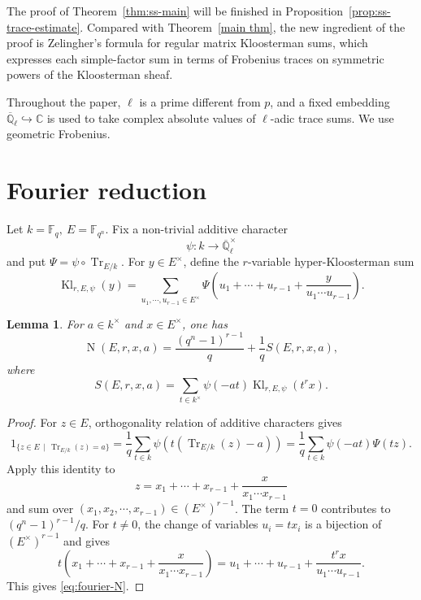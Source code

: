 \documentclass[11pt]{amsart}
\newtheorem{lemma}[theorem]{Lemma}
\theoremstyle{remark}
\newcommand{\F}{\mathbb F}
\newcommand{\Ql}{\overline{\mathbb Q}_{\ell}}
\newcommand{\Tr}{\operatorname{Tr}}
\newcommand{\Kl}{\operatorname{Kl}}
\newcommand{\Nm}{\operatorname{N}}
\begin{document}
The proof of Theorem~\ref{thm:ss-main} will be finished in Proposition~\ref{prop:ss-trace-estimate}. Compared with Theorem~\ref{main thm}, the new ingredient of the proof is Zelingher's formula for
regular matrix Kloosterman sums, which expresses each simple-factor sum in
terms of Frobenius traces on symmetric powers of the Kloosterman sheaf.

Throughout the paper, $\ell$ is a prime different
from $p$, and a fixed embedding $\Ql\hookrightarrow\mathbb{C}$ is used to take
complex absolute values of $\ell$-adic trace sums.  We use geometric Frobenius.

\section{Fourier reduction}\label{sec:fourier}

Let $k=\F_q,~E=\F_{q^n}$. Fix a non-trivial additive character
\[
\psi:k\longrightarrow \Ql^{\times}
\]
and put $\Psi=\psi\circ\Tr_{E/k}$. For $y\in E^{\times}$, define the $r$-variable hyper-Kloosterman sum
\begin{equation}\label{eq:Kl-def}
    \Kl_{r,E,\psi}(y)=\sum_{u_1,\cdots,u_{r-1}\in E^{\times}}\Psi\left(u_1+\cdots+u_{r-1}+\frac{y}{u_1\cdots u_{r-1}}\right).
\end{equation}

\begin{lemma}\label{lem:fourier}
For $a\in k^{\times}$ and $x\in E^{\times}$, one has
\begin{equation}\label{eq:fourier-N}
    \Nm(E,r,x,a)=\frac{(q^n-1)^{r-1}}{q}+\frac{1}{q} S(E,r,x,a),
\end{equation}
where
\begin{equation}\label{eq:S-def}
    S(E,r,x,a)=\sum_{t\in k^{\times}}\psi(-at) \Kl_{r,E,\psi}(t^r x).
\end{equation}
\end{lemma}

\begin{proof}
For $z\in E$, orthogonality relation of additive characters gives
\[
    1_{\{z\in E \,\mid\, \Tr_{E/k}(z)=a\}}
    =\frac{1}{q}\sum_{t\in k}\psi\left(t\left(\Tr_{E/k}(z)-a\right)\right)=\frac{1}{q}\sum_{t\in k}\psi(-at)\Psi(tz).
\]
Apply this identity to
\[
z=x_1+\cdots+x_{r-1}+\frac{x}{x_1\cdots x_{r-1}}
\]
and sum over $(x_1,x_2,\cdots,x_{r-1})\in(E^{\times})^{r-1}$.
The term $t=0$ contributes to $(q^n-1)^{r-1}/q$. For $t\neq 0$, the change of
variables $u_i=tx_i$ is a bijection of $(E^{\times})^{r-1}$ and gives
\[
    t\left(x_1+\cdots+x_{r-1}+\frac{x}{x_1\cdots x_{r-1}}\right)=u_1+\cdots+u_{r-1}+\frac{t^r x}{u_1\cdots u_{r-1}}.
\]
This gives \eqref{eq:fourier-N}.
\end{proof}
\end{document}
